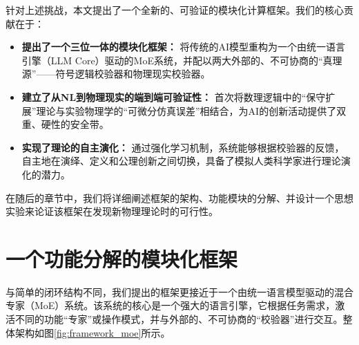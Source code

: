 \documentclass[11pt, a4paper]{article}
\begin{document}
针对上述挑战，本文提出了一个全新的、可验证的模块化计算框架。我们的核心贡献在于：

\begin{itemize}
	\item \textbf{提出了一个三位一体的模块化框架：} 将传统的AI模型重构为一个由统一语言引擎（LLM Core）驱动的MoE系统，并配以两大外部的、不可协商的“真理源”——符号逻辑校验器和物理现实校验器。
	\item \textbf{建立了从NL到物理现实的端到端可验证性：} 首次将数理逻辑中的“保守扩展”理论与实验物理学的“可微分仿真误差”相结合，为AI的创新活动提供了双重、硬性的安全带。
	\item \textbf{实现了理论的自主演化：} 通过强化学习机制，系统能够根据校验器的反馈，自主地在演绎、定义和公理创新之间切换，具备了模拟人类科学家进行理论演化的潜力。
\end{itemize}

在随后的章节中，我们将详细阐述框架的架构、功能模块的分解、并设计一个思想实验来论证该框架在发现新物理理论时的可行性。
\section{一个功能分解的模块化框架}
与简单的闭环结构不同，我们提出的框架更接近于一个由统一语言模型驱动的混合专家（MoE）系统。该系统的核心是一个强大的语言引擎，它根据任务需求，激活不同的功能“专家”或操作模式，并与外部的、不可协商的“校验器”进行交互。整体架构如图\ref{fig:framework_moe}所示。
\end{document}
